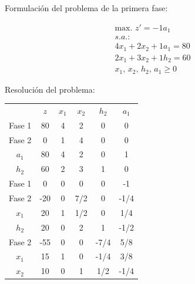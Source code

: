 Formulación del problema de la primera fase:

\begin{equation}
\begin{split}
\mbox{max. } z' = -1a_1\\
s.a.:\\
4x_1+2x_2+1a_1 = 80\\
2x_1+3x_2+1h_2 = 60\\
x_1,\,x_2,\,h_2,\,a_1\geq 0\end{split}
\end{equation}

Resolución del problema:

\begin{center}
\begin{tabular}{c|c|cccc|}
 & $z$ & $x_1$ & $x_2$ & $h_2$ & $a_1$\\ 
Fase 1 & 80 & 4 & 2 & 0 & 0 \\ 
Fase 2 & 0 & 1 & 4 & 0 & 0 \\ 
\hline
$a_1$ & 80  & 4 & 2 & 0 & 1\\ 
$h_2$ & 60  & 2 & 3 & 1 & 0\\ 
\hline
Fase 1 & 0 & 0 & 0 & 0 & -1 \\ 
Fase 2 & -20 & 0 & 7/2 & 0 & -1/4 \\ 
\hline
$x_1$ & 20  & 1 & 1/2 & 0 & 1/4\\ 
$h_2$ & 20  & 0 & 2 & 1 & -1/2\\ 
\hline
Fase 2 & -55 & 0 & 0 & -7/4 & 5/8 \\ 
\hline
$x_1$ & 15  & 1 & 0 & -1/4 & 3/8\\ 
$x_2$ & 10  & 0 & 1 & 1/2 & -1/4\\ 
\hline
\end{tabular}
\end{center}

